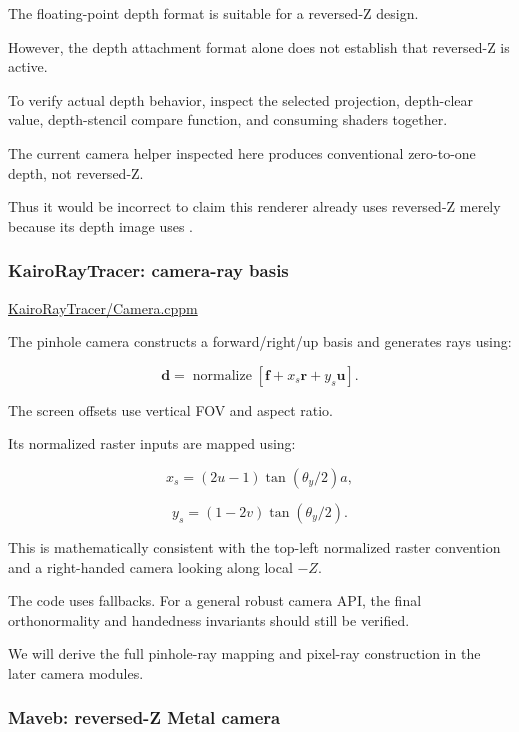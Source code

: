 The floating-point depth format is suitable for a reversed-Z design.

However, the depth attachment format alone does not establish that reversed-Z is active.

To verify actual depth behavior, inspect the selected projection, depth-clear value, depth-stencil compare function, and consuming shaders together.

The current camera helper inspected here produces conventional zero-to-one depth, not reversed-Z.

Thus it would be incorrect to claim this renderer already uses reversed-Z merely because its depth image uses .

\subsubsection{KairoRayTracer: camera-ray basis}\label{02-foundations-ii-ch037-kairoraytracer-camera-ray-basis}

\hypertarget{02-foundations-ii-ch037-kairoraytracer-camera-ray-basis}{}

\href{https://github.com/swayam8624/KairoRayTracer/blob/main/Camera.cppm?utm_source=chatgpt.com}{KairoRayTracer/Camera.cppm}

The pinhole camera constructs a forward/right/up basis and generates rays using:

\[
 \boxed{ \mathbf d= \operatorname{normalize} \left[ \mathbf f+ x_s\mathbf r+ y_s\mathbf u \right] }.
\]

The screen offsets use vertical FOV and aspect ratio.

Its normalized raster inputs are mapped using:

\[
 x_s=(2u-1)\tan(\theta_y/2)a,
\]

\[
 y_s=(1-2v)\tan(\theta_y/2).
\]

This is mathematically consistent with the top-left normalized raster convention and a right-handed camera looking along local \(-Z\).

The code uses  fallbacks. For a general robust camera API, the final orthonormality and handedness invariants should still be verified.

We will derive the full pinhole-ray mapping and pixel-ray construction in the later camera modules.

\subsubsection{Maveb: reversed-Z Metal camera}\label{02-foundations-ii-ch037-maveb-reversed-z-metal-camera}

